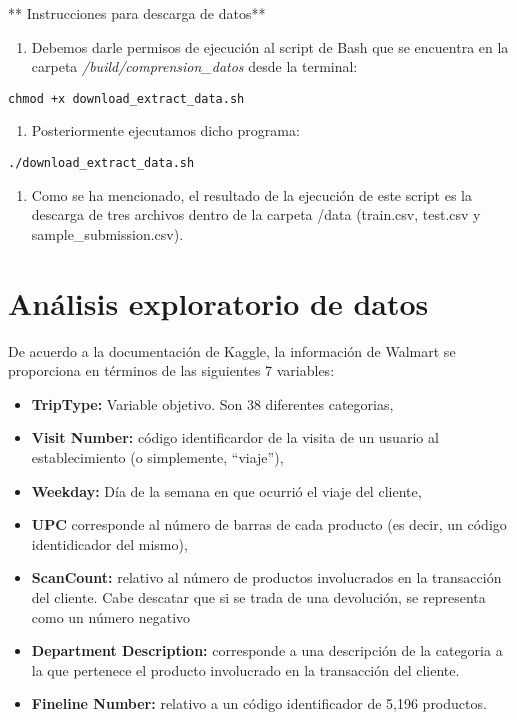 \documentclass[]{book}
\providecommand{\tightlist}{%
  \setlength{\itemsep}{0pt}\setlength{\parskip}{0pt}}
\begin{document}
** Instrucciones para descarga de datos**

\begin{enumerate}
\def\labelenumi{\arabic{enumi}.}
\tightlist
\item
  Debemos darle permisos de ejecución al script de Bash que se encuentra en la carpeta \emph{/build/comprension\_datos} desde la terminal:
\end{enumerate}

\begin{verbatim}
chmod +x download_extract_data.sh
\end{verbatim}

\begin{enumerate}
\def\labelenumi{\arabic{enumi}.}
\setcounter{enumi}{1}
\tightlist
\item
  Posteriormente ejecutamos dicho programa:
\end{enumerate}

\begin{verbatim}
./download_extract_data.sh
\end{verbatim}

\begin{enumerate}
\def\labelenumi{\arabic{enumi}.}
\setcounter{enumi}{2}
\tightlist
\item
  Como se ha mencionado, el resultado de la ejecución de este script es la descarga de tres archivos dentro de la carpeta /data (train.csv, test.csv y sample\_submission.csv).
\end{enumerate}

\hypertarget{anuxe1lisis-exploratorio-de-datos}{%
\section{Análisis exploratorio de datos}\label{anuxe1lisis-exploratorio-de-datos}}

De acuerdo a la documentación de Kaggle, la información de Walmart se proporciona en términos de las siguientes 7 variables:

\begin{itemize}
\tightlist
\item
  \textbf{TripType:} Variable objetivo. Son 38 diferentes categorias,
\item
  \textbf{Visit Number:} código identificardor de la visita de un usuario al establecimiento (o simplemente, ``viaje''),
\item
  \textbf{Weekday:} Día de la semana en que ocurrió el viaje del cliente,
\item
  \textbf{UPC} corresponde al número de barras de cada producto (es decir, un código identidicador del mismo),
\item
  \textbf{ScanCount:} relativo al número de productos involucrados en la transacción del cliente. Cabe descatar que si se trada de una devolución, se representa como un número negativo
\item
  \textbf{Department Description:} corresponde a una descripción de la categoria a la que pertenece el producto involucrado en la transacción del cliente.
\item
  \textbf{Fineline Number:} relativo a un código identificador de 5,196 productos.
\end{itemize}
\end{document}
